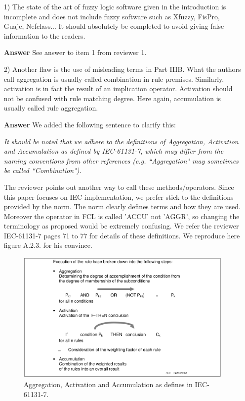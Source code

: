 \documentclass[10pt,a4paper]{article}
\begin{document}
\begin{itemize}   
   \item[1)] The state of the art of fuzzy logic software given in the introduction is
   incomplete and does not include fuzzy software such as Xfuzzy, FisPro,
   Guaje, Nefclass... It should absolutely be completed to avoid giving
   false information to the readers.

   \item[\textbf{Answer}] See answer to item 1 from reviewer 1.
   
   \item[2)] Another flaw is the use of misleading terms in Part IIIB. What the authors
   call aggregation is usually called combination in rule premises.
   Similarly, activation is in fact the result of an implication operator.
   Activation should not be confused with rule matching degree.
    Here again, accumulation is usually called rule aggregation.

   \item[\textbf{Answer}] We added the following sentence to clarify this:
   
\textit{It should be noted that we adhere to the definitions of Aggregation, Activation and Accumulation as defined by IEC-61131-7, which may differ from the naming conventions from other references (e.g. ``Aggregation" may sometimes be called ``Combination").}
   
   The reviewer points out another way to call these methods/operators. 
   Since this paper focuses on IEC implementation, we prefer stick to the definitions provided by the norm. 
   The norm clearly defines terms and how they are used. 
   Moreover the operator in FCL is called 'ACCU' not 'AGGR', so changing the terminology as proposed would be extremely confusing. 
   We refer the reviewer IEC-61131-7 pages 71 to 77 for details of these definitions. 
   We reproduce here figure A.2.3. for his convince.
   
\begin{figure}[!h]
\centering
\includegraphics[width=5in]{figs/AccAgg.png}
\caption{Aggregation, Activation and Accumulation as defines in IEC-61131-7.}
\label{f:tipperMf}
\end{figure}


\end{itemize}
\end{document}
